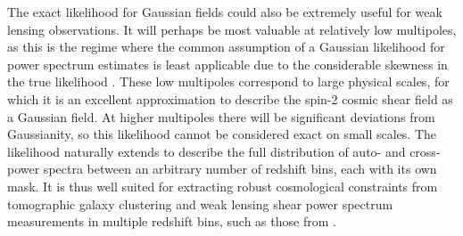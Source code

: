 The exact likelihood for Gaussian fields could also be extremely useful for weak lensing observations. It will perhaps be most valuable at relatively low multipoles, as this is the regime where the common assumption of a Gaussian likelihood for power spectrum estimates is least applicable due to the considerable skewness in the true likelihood \citep[e.g.][]{Sellentin2018a}. These low multipoles correspond to large physical scales, for which it is an excellent approximation to describe the spin-2 cosmic shear field as a Gaussian field. At higher multipoles there will be significant deviations from Gaussianity, so this likelihood cannot be considered exact on small scales. The likelihood naturally extends to describe the full distribution of auto- and cross-power spectra between an arbitrary number of redshift bins, each with its own mask. It is thus well suited for extracting robust cosmological constraints from tomographic galaxy clustering and weak lensing shear power spectrum measurements in multiple redshift bins, such as those from \Euclid{}.

